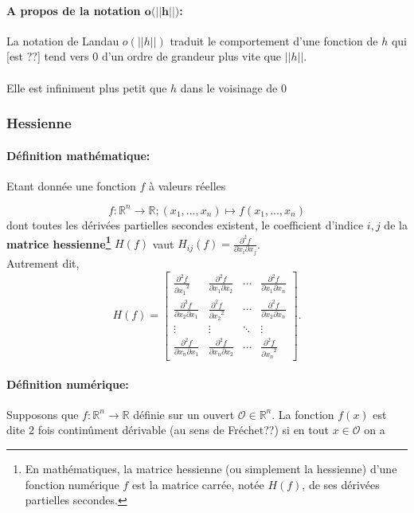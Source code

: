 	\paragraph*{A propos de la notation $\textbf{o(||h||)}$:}
	La notation de Landau $o(||h||)$ traduit le comportement d’une fonction de $h$ qui [est ??] tend vers $0$ d’un ordre de grandeur plus vite que $||h||$.\\\\
	Elle est infiniment plus petit que $h$ dans le voisinage de $0$
	
	
	
	
	\subsubsection{Hessienne}
	\paragraph*{Définition mathématique:}
	Etant donnée une fonction ${f}$ à valeurs réelles
	
	$${ f:\mathbb{R}^{n}\to \mathbb {R} ;(x_{1},...,x_{n})\mapsto f(x_{1},...,x_{n})}$$
	dont toutes les dérivées partielles secondes existent, le coefficient d'indice ${ i,j}$ de la \textbf{matrice hessienne\footnote{En mathématiques, la matrice hessienne (ou simplement la hessienne) d'une fonction numérique $f$ est la matrice carrée, notée $H(f)$, de ses dérivées partielles secondes.}} ${H(f)}$ vaut ${H_{ij}(f)={\frac {\partial ^{2}f}{\partial x_{i}\partial x_{j}}}}$.\\
	Autrement dit,
	$$
	{ H(f)={
	\begin{bmatrix}{
	\frac {\partial ^{2}f}{{\partial x_{1}}^{2}}}&{\frac {\partial ^{2}f}{\partial x_{1}\partial x_{2}}}&\cdots &{\frac {\partial ^{2}f}{\partial x_{1}\partial x_{n}}}\\
	{\frac {\partial ^{2}f}{\partial x_{2}\partial x_{1}}}&{\frac {\partial ^{2}f}{{\partial x_{2}}^{2}}}&\cdots &{\frac {\partial ^{2}f}{\partial x_{2}\partial x_{n}}}\\
	\vdots &\vdots &\ddots &\vdots \\
	{\frac {\partial ^{2}f}{\partial x_{n}\partial x_{1}}}&{\frac {\partial ^{2}f}{\partial x_{n}\partial x_{2}}}&\cdots &{\frac {\partial ^{2}f}{{\partial x_{n}}^{2}}}
	\end{bmatrix}}} .
	$$
	
	\paragraph*{Définition numérique:}
	Supposons que $f : \mathbb{R}^{n} \to \mathbb{R}$ définie sur un ouvert $\mathcal{O} \in \mathbb{R}^{n}$. La fonction $f(x)$ est dite 2
	fois continûment dérivable (au sens de Fréchet??) si en tout $x \in \mathcal{O}$ on a
	
